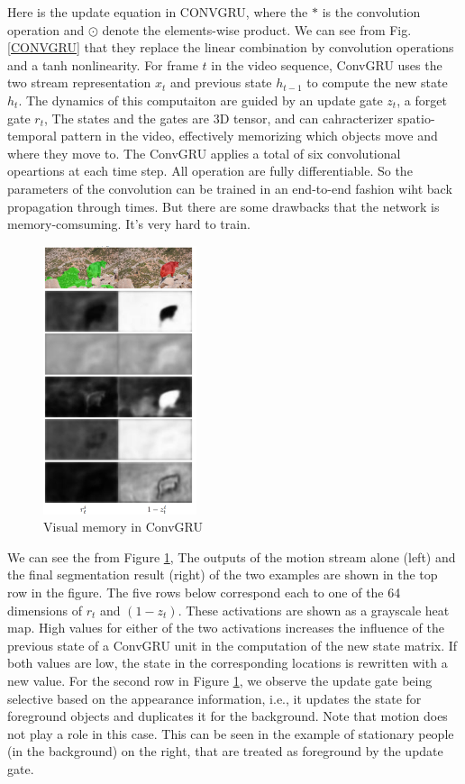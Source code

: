 Here is the update equation in CONVGRU, where the $*$ is the convolution operation and $\odot$ denote the elements-wise product.
We can see from Fig.\ref{CONVGRU} that they replace the linear combination by convolution operations and a tanh nonlinearity. For frame $t$ in the video
sequence, ConvGRU uses the two stream representation $x_t$ and previous state $h_{t-1}$ to compute the new state $h_t$. The dynamics of this computaiton 
are guided by an update gate $z_t$, a forget gate $r_t$, The states  and the gates are $3$D tensor, and can cahracterizer spatio-temporal pattern in
the video, effectively memorizing which objects move and where they move to. The ConvGRU applies a total of six convolutional opeartions at each time step.
All operation are fully differentiable. So the parameters of the convolution can be trained in an end-to-end fashion wiht back propagation through times.
But there are some drawbacks that the network is memory-comsuming. It's very hard to train. 
\begin{figure}[ht]
    \centering
    \includegraphics[width=0.4\textwidth]{figure/visual_memory.png}
    \caption{Visual memory in ConvGRU}
    \label{vis}
\end{figure}

We can see the from Figure \ref{vis}, The outputs of the motion stream alone (left) and the final segmentation result (right) of the two examples are
shown in the top row in the figure. The five rows below correspond each to one of the 64 dimensions of $r_t$ and $(1− z_t)$.
These activations are shown as a grayscale heat map. 
High values for either of the two activations increases the influence of the previous state of a ConvGRU unit in the computation of the new state matrix. 
If both values are low, the state in the corresponding locations is rewritten with a new value. 
For the second row in Figure \ref{vis}, we observe the update gate being selective based on the appearance information, i.e., it updates the
state for foreground objects and duplicates it for the background. Note that motion does not play a role in this case.
This can be seen in the example of stationary people (in the
background) on the right, that are treated as foreground by
the update gate.

